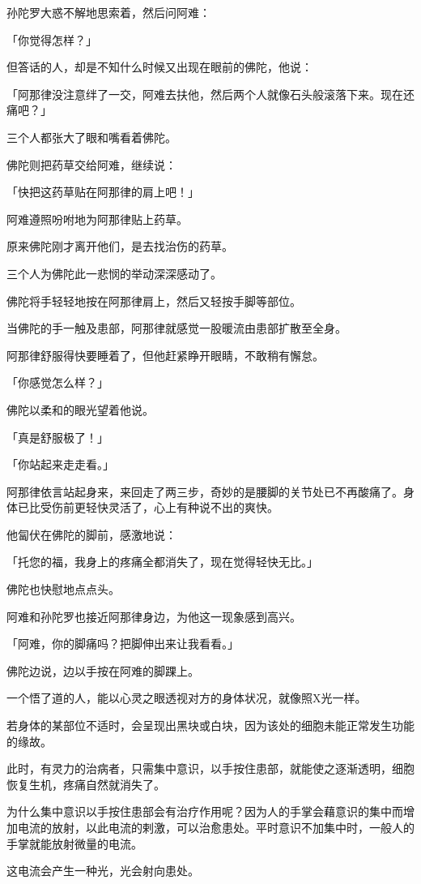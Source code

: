 \documentclass[twoside,openany]{book}
\begin{document}
孙陀罗大惑不解地思索着，然后问阿难：

「你觉得怎样？」

但答话的人，却是不知什么时候又出现在眼前的佛陀，他说：

「阿那律没注意绊了一交，阿难去扶他，然后两个人就像石头般滚落下来。现在还痛吧？」

三个人都张大了眼和嘴看着佛陀。

佛陀则把药草交给阿难，继续说：

「快把这药草贴在阿那律的肩上吧！」

阿难遵照吩咐地为阿那律贴上药草。

原来佛陀刚才离开他们，是去找治伤的药草。

三个人为佛陀此一悲悯的举动深深感动了。

佛陀将手轻轻地按在阿那律肩上，然后又轻按手脚等部位。

当佛陀的手一触及患部，阿那律就感觉一股暖流由患部扩散至全身。

阿那律舒服得快要睡着了，但他赶紧睁开眼睛，不敢稍有懈怠。

「你感觉怎么样？」

佛陀以柔和的眼光望着他说。

「真是舒服极了！」

「你站起来走走看。」

阿那律依言站起身来，来回走了两三步，奇妙的是腰脚的关节处已不再酸痛了。身体已比受伤前更轻快灵活了，心上有种说不出的爽快。

他匐伏在佛陀的脚前，感激地说：

「托您的福，我身上的疼痛全都消失了，现在觉得轻快无比。」

佛陀也快慰地点点头。

阿难和孙陀罗也接近阿那律身边，为他这一现象感到高兴。

「阿难，你的脚痛吗？把脚伸出来让我看看。」

佛陀边说，边以手按在阿难的脚踝上。

一个悟了道的人，能以心灵之眼透视对方的身体状况，就像照X光一样。

若身体的某部位不适时，会呈现出黑块或白块，因为该处的细胞未能正常发生功能的缘故。

此时，有灵力的治病者，只需集中意识，以手按住患部，就能使之逐渐透明，细胞恢复生机，疼痛自然就消失了。

为什么集中意识以手按住患部会有治疗作用呢？因为人的手掌会藉意识的集中而增加电流的放射，以此电流的剌激，可以治愈患处。平时意识不加集中时，一般人的手掌就能放射微量的电流。

这电流会产生一种光，光会射向患处。
\end{document}
